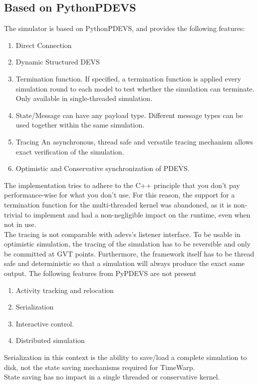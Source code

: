 \subsection{Based on PythonPDEVS}
The simulator is based on PythonPDEVS, and provides the following features: 
\begin{enumerate}
	\item Direct Connection
	\item Dynamic Structured DEVS
	\item Termination function. If specified, a termination function is applied every simulation round to each model to test whether the simulation can terminate. Only available in single-threaded simulation.
	\item State/Message can have any payload type. Different message types can be used together within the same simulation.
	\item Tracing An asynchronous, thread safe and versatile tracing mechanism allows exact verification of the simulation.
	\item Optimistic and Conservative synchronization of PDEVS.
\end{enumerate}
The implementation tries to adhere to the C++ principle that you don't pay performance-wise for what you don't use. For this reason, the support for a termination function for the multi-threaded kernel was abandoned, as it is non-trivial to implement and had a non-negligible impact on the runtime, even when not in use.\\
The tracing is not comparable with adevs's listener interface. To be usable in optimistic simulation, the tracing of the simulation has to be reversible and only be committed at GVT points. Furthermore, the framework itself has to be thread safe and deterministic so that a simulation will always produce the exact same output.
The following features from PyPDEVS are not present
\begin{enumerate}
	\item Activity tracking and relocation
	\item Serialization
	\item Interactive control. 
	\item Distributed simulation
\end{enumerate}
Serialization in this context is the ability to save/load a complete simulation to disk, not the state saving mechanisms required for TimeWarp.\\ State saving has no impact in a single threaded or conservative kernel.\\
